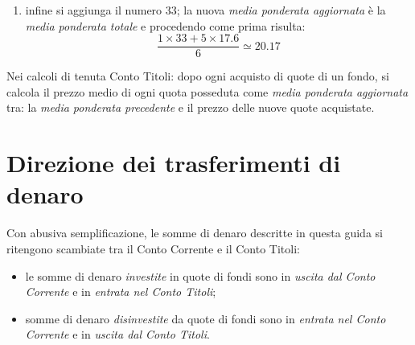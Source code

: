 \documentclass[12pt,a4paper]{article}
\begin{document}
\begin{enumerate}
\item  infine  si  aggiunga  il  numero  \num{33};  la  nuova  \emph{media  ponderata
     aggiornata} è la \emph{media ponderata totale} e procedendo come prima risulta:
  \begin{equation*}
    \frac{\num{1} \times{} \num{33}
       + \num{5} \times{} \num{17,6}}{\num{6}}
    \simeq \num{20,17}
  \end{equation*}
\end{enumerate}

Nei calcoli  di tenuta  Conto Titoli:  dopo ogni acquisto  di quote  di un  fondo, si
calcola  il  prezzo  medio  di   ogni  quota  posseduta  come  \emph{media  ponderata
   aggiornata}  tra: la  \emph{media ponderata  precedente} e  il prezzo  delle nuove
quote acquistate.

\section{Direzione dei trasferimenti di denaro}


Con  abusiva  semplificazione, le  somme  di  denaro  descritte  in questa  guida  si
ritengono scambiate tra il Conto Corrente e il Conto Titoli:
\begin{itemize}
\item le somme di denaro \emph{investite} in  quote di fondi sono in \emph{uscita dal
     Conto Corrente} e in \emph{entrata nel Conto Titoli};
\item somme di denaro \emph{disinvestite} da quote di fondi sono in \emph{entrata nel
     Conto Corrente} e in \emph{uscita dal Conto Titoli}.
\end{itemize}
\end{document}
